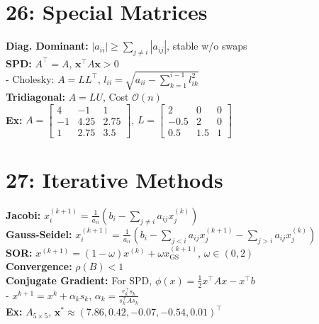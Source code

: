 \documentclass[9pt]{article}
\begin{document}
\begin{multicols}{2}
\section*{26: Special Matrices}
\textbf{Diag. Dominant:} $|a_{ii}| \geq \sum_{j \neq i} |a_{ij}|$, stable w/o swaps \\
\textbf{SPD:} $A^\top = A$, $\mathbf{x}^\top A\mathbf{x} > 0$ \\
- Cholesky: $A = LL^\top$, $l_{ii} = \sqrt{a_{ii} - \sum_{k=1}^{i-1} l_{ik}^2}$ \\
\textbf{Tridiagonal:} $A = LU$, Cost $\mathcal{O}(n)$ \\
\textbf{Ex:} $A = \begin{bmatrix} 4 & -1 & 1 \\ -1 & 4.25 & 2.75 \\ 1 & 2.75 & 3.5 \end{bmatrix}$, $L = \begin{bmatrix} 2 & 0 & 0 \\ -0.5 & 2 & 0 \\ 0.5 & 1.5 & 1 \end{bmatrix}$

\section*{27: Iterative Methods}
\textbf{Jacobi:} $x_i^{(k+1)} = \frac{1}{a_{ii}}\left(b_i - \sum_{j \neq i} a_{ij}x_j^{(k)}\right)$ \\
\textbf{Gauss-Seidel:} $x_i^{(k+1)} = \frac{1}{a_{ii}}\left(b_i - \sum_{j<i} a_{ij}x_j^{(k+1)} - \sum_{j>i} a_{ij}x_j^{(k)}\right)$ \\
\textbf{SOR:} $x^{(k+1)} = (1-\omega)x^{(k)} + \omega x_{\text{GS}}^{(k+1)}$, $\omega \in (0, 2)$ \\
\textbf{Convergence:} $\rho(B) < 1$ \\
\textbf{Conjugate Gradient:} For SPD, $\phi(x) = \frac{1}{2}x^\top Ax - x^\top b$ \\
- $x^{k+1} = x^k + \alpha_k s_k$, $\alpha_k = \frac{r_k^\top s_k}{s_k^\top A s_k}$ \\
\textbf{Ex:} $A_{5\times5}$, $\mathbf{x}^* \approx (7.86, 0.42, -0.07, -0.54, 0.01)^\top$

\end{multicols}
\end{document}

